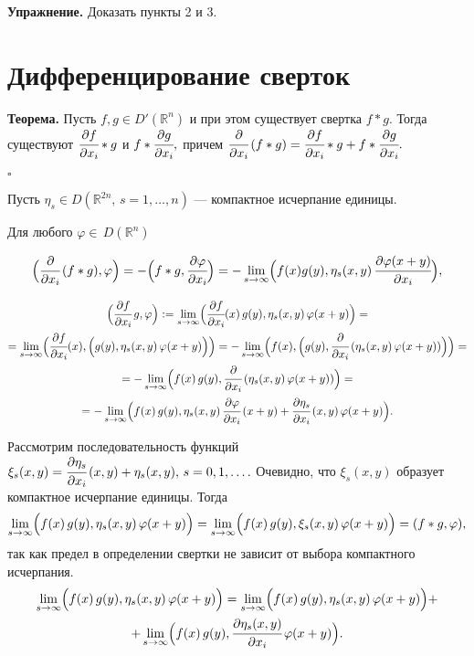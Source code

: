 \documentclass[unicode,12pt,draft]{article}
\begin{document}
\textbf{Упражнение.} Доказать пункты 2 и 3.

\section{Дифференцирование сверток}

\textbf{Теорема.} Пусть $f,g\in D'(\mathbb R^n)$ и при этом
существует свертка $f*g.$ Тогда существуют $\cfrac{\partial
f}{\partial x_i}*g$ и $f*\cfrac{\partial g}{\partial x_i},$ причем
$\cfrac{\partial}{\partial x_i}\,(f*g)=\cfrac{\partial f}{\partial
x_i}*g+ f*\cfrac{\partial g}{\partial x_i}.$

$\square$

Пусть $\eta_s\in D(\mathbb R^{2n},\,s=1,\ldots,n)$ --- компактное
исчерпание единицы.

Для любого $\varphi\in\,D(\mathbb R^n)$

$$\Bigl(\cfrac{\partial}{\partial x_i}\,(f*g),\varphi\Bigr)=
-\Bigl(f*g,\cfrac{\partial \varphi}{\partial x_i}\Bigr)=
-\lim\limits_{s\to\infty}\Bigl(f(x)g(y),\eta_s(x,y)\,\cfrac{\partial
\varphi(x+y)}{\partial x_i} \Bigr),$$

\begin{multline}\Bigl(\cfrac{\partial f}{\partial x_i}\,g,\varphi\Bigr):=
\lim\limits_{s\to\infty}\Bigl( \cfrac{\partial f}{\partial
x_i}(x)\,g(y),\eta_s(x,y)\,\varphi(x+y) \Bigr)=\\=
\lim\limits_{s\to\infty}\Bigl( \cfrac{\partial f}{\partial
x_i}(x),\Bigl(g(y),\eta_s(x,y)\,\varphi(x+y)\Bigr) \Bigr)=
-\lim\limits_{s\to\infty}\Bigl(f(x),\Bigl(g(y),\cfrac{\partial}{\partial
x_i}\,(\eta_s(x,y)\,\varphi(x+y))\Bigr) \Bigr)=\\=
-\lim\limits_{s\to\infty}\Bigl(f(x)\,g(y),\cfrac{\partial}{\partial
x_i}\,(\eta_s(x,y)\,\varphi(x+y))\Bigr)=\\=
-\lim\limits_{s\to\infty}\Bigl(f(x)\,g(y),\eta_s(x,y)\,\cfrac{\partial\varphi}{\partial
x_i}\,(x+y)+ \cfrac{\partial\eta_s}{\partial
x_i}\,(x,y)\,\varphi(x+y)\Bigr).
\end{multline}

Рассмотрим последовательность функций
$\xi_s(x,y)=\cfrac{\partial\eta_s}{\partial x_i}\,(x,y)+
\eta_s(x,y),\,s=0,1,\ldots.$ Очевидно, что $\xi_s(x,y)$ образует
компактное исчерпание единицы. Тогда
$$\lim\limits_{s\to\infty}\Bigl(f(x)\,g(y),\eta_s(x,y)\,\varphi(x+y)\Bigr)=
\lim\limits_{s\to\infty}\Bigl(f(x)\,g(y),\xi_s(x,y)\,\varphi(x+y)\Bigr)=
(f*g,\varphi),$$ так как предел в определении свертки не зависит
от выбора компактного исчерпания.
\begin{multline}
\lim\limits_{s\to\infty}\Bigl(f(x)\,g(y),\eta_s(x,y)\,\varphi(x+y)\Bigr)=
\lim\limits_{s\to\infty}\Bigl(f(x)\,g(y),\eta_s(x,y)\,\varphi(x+y)\Bigr)+\\+
\lim\limits_{s\to\infty}\Bigl(f(x)\,g(y),\cfrac{\partial\eta_s(x,y)}{\partial
x_i}\,\varphi(x+y)\Bigr).\end{multline}
\end{document}
